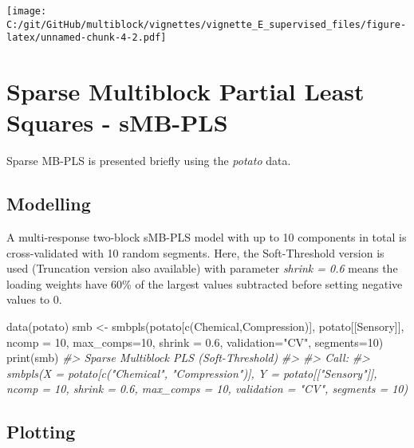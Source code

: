 \documentclass[
]{article}
\newenvironment{Shaded}{\begin{snugshade}}{\end{snugshade}}
\newcommand{\AttributeTok}[1]{\textcolor[rgb]{0.77,0.63,0.00}{#1}}
\newcommand{\CommentTok}[1]{\textcolor[rgb]{0.56,0.35,0.01}{\textit{#1}}}
\newcommand{\DecValTok}[1]{\textcolor[rgb]{0.00,0.00,0.81}{#1}}
\newcommand{\FloatTok}[1]{\textcolor[rgb]{0.00,0.00,0.81}{#1}}
\newcommand{\FunctionTok}[1]{\textcolor[rgb]{0.00,0.00,0.00}{#1}}
\newcommand{\NormalTok}[1]{#1}
\newcommand{\OtherTok}[1]{\textcolor[rgb]{0.56,0.35,0.01}{#1}}
\newcommand{\StringTok}[1]{\textcolor[rgb]{0.31,0.60,0.02}{#1}}
\begin{document}
\texttt{[image: C:/git/GitHub/multiblock/vignettes/vignette\_E\_supervised\_files/figure-latex/unnamed-chunk-4-2.pdf]}

\hypertarget{sparse-multiblock-partial-least-squares---smb-pls}{%
\section{Sparse Multiblock Partial Least Squares -
sMB-PLS}\label{sparse-multiblock-partial-least-squares---smb-pls}}

Sparse MB-PLS is presented briefly using the \emph{potato} data.

\hypertarget{modelling-1}{%
\subsection{Modelling}\label{modelling-1}}

A multi-response two-block sMB-PLS model with up to 10 components in
total is cross-validated with 10 random segments. Here, the
Soft-Threshold version is used (Truncation version also available) with
parameter \emph{shrink = 0.6} means the loading weights have 60\% of the
largest values subtracted before setting negative values to 0.

\begin{Shaded}
\begin{Highlighting}[]
\FunctionTok{data}\NormalTok{(potato)}
\NormalTok{smb }\OtherTok{\textless{}{-}} \FunctionTok{smbpls}\NormalTok{(potato[}\FunctionTok{c}\NormalTok{(}\StringTok{\textquotesingle{}Chemical\textquotesingle{}}\NormalTok{,}\StringTok{\textquotesingle{}Compression\textquotesingle{}}\NormalTok{)], potato[[}\StringTok{\textquotesingle{}Sensory\textquotesingle{}}\NormalTok{]], }\AttributeTok{ncomp =} \DecValTok{10}\NormalTok{,}
            \AttributeTok{max\_comps=}\DecValTok{10}\NormalTok{, }\AttributeTok{shrink =} \FloatTok{0.6}\NormalTok{, }\AttributeTok{validation=}\StringTok{"CV"}\NormalTok{, }\AttributeTok{segments=}\DecValTok{10}\NormalTok{)}
\FunctionTok{print}\NormalTok{(smb)}
\CommentTok{\#\textgreater{} Sparse Multiblock PLS (Soft{-}Threshold) }
\CommentTok{\#\textgreater{} }
\CommentTok{\#\textgreater{} Call:}
\CommentTok{\#\textgreater{} smbpls(X = potato[c("Chemical", "Compression")], Y = potato[["Sensory"]],     ncomp = 10, shrink = 0.6, max\_comps = 10, validation = "CV",     segments = 10)}
\end{Highlighting}
\end{Shaded}

\hypertarget{plotting}{%
\subsection{Plotting}\label{plotting}}
\end{document}
